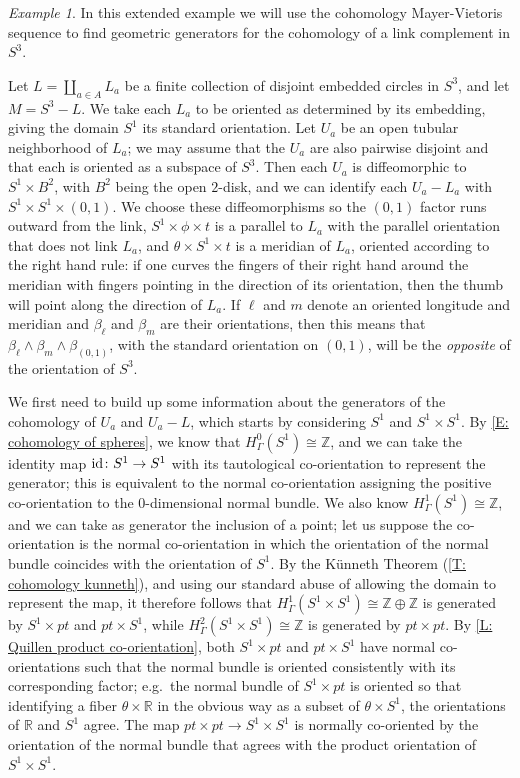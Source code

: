 \documentclass[12pt]{article}
\theoremstyle{plain}
\theoremstyle{definition}
\theoremstyle{remark}
\newtheorem{example}[theorem]{Example}
\newcommand{\Z}{\mathbb{Z}}
\newcommand{\R}{\mathbb{R}}
\newcommand{\id}{\textup{id}}
\begin{document}
\begin{example}
In this extended example we will use the cohomology Mayer-Vietoris sequence to find geometric generators for the cohomology of a link complement in $S^3$.

Let $L = \amalg_{a \in A} L_a$ be a finite collection of disjoint embedded circles in $S^3$, and let $M = S^3 - L$.
We take each $L_a$ to be oriented as determined by its embedding, giving the domain $S^1$ its standard orientation.
Let $U_a$ be an open tubular neighborhood of $L_a$; we may assume that the $U_a$ are also pairwise disjoint and that each is oriented as a subspace of $S^3$.
Then each $U_a$ is diffeomorphic to $S^1 \times B^2$, with $B^2$ being the open $2$-disk, and we can identify each $U_a - L_a$ with $S^1 \times S^1 \times (0,1)$.
We choose these diffeomorphisms so the $(0,1)$ factor runs outward from the link, $S^1 \times \phi \times t$ is a parallel to $L_a$ with the parallel orientation that does not link $L_a$, and $\theta \times S^1 \times t$ is a meridian of $L_a$, oriented according to the right hand rule: if one curves the fingers of their right hand around the meridian with fingers pointing in the direction of its orientation, then the thumb will point along the direction of $L_a$.
If $\ell$ and $m$ denote an oriented longitude and meridian and $\beta_\ell$ and $\beta_m$ are their orientations, then this means that $\beta_\ell \wedge \beta_m \wedge \beta_{(0,1)}$, with the standard orientation on $(0,1)$, will be the \emph{opposite} of the orientation of $S^3$.

We first need to build up some information about the generators of the cohomology of $U_a$ and $U_a - L$, which starts by considering $S^1$ and $S^1 \times S^1$.
By \cref{E: cohomology of spheres}, we know that $H^0_\Gamma(S^1) \cong \Z$, and we can take the identity map $\id \colon S^1 \to S^1$ with its tautological co-orientation to represent the generator; this is equivalent to the normal co-orientation assigning the positive co-orientation to the $0$-dimensional normal bundle.
We also know $H^1_\Gamma(S^1) \cong \Z$, and we can take as generator the inclusion of a point; let us suppose the co-orientation is the normal co-orientation in which the orientation of the normal bundle coincides with the orientation of $S^1$.
By the K\"unneth Theorem (\cref{T: cohomology kunneth}), and using our standard abuse of allowing the domain to represent the map, it therefore follows that $H^1_\Gamma(S^1 \times S^1) \cong \Z \oplus \Z$ is generated by $S^1 \times pt$ and $pt \times S^1$, while $H^2_\Gamma(S^1 \times S^1) \cong \Z$ is generated by $pt \times pt$.
By \cref{L: Quillen product co-orientation}, both $S^1 \times pt$ and $pt \times S^1$ have normal co-orientations such that the normal bundle is oriented consistently with its corresponding factor; e.g.\ the normal bundle of $S^1 \times pt$ is oriented so that identifying a fiber $\theta \times \R$ in the obvious way as a subset of $\theta \times S^1$, the orientations of $\R$ and $S^1$ agree.
The map $pt \times pt \to S^1 \times S^1$ is normally co-oriented by the orientation of the normal bundle that agrees with the product orientation of $S^1 \times S^1$.


\end{example}
\end{document}
